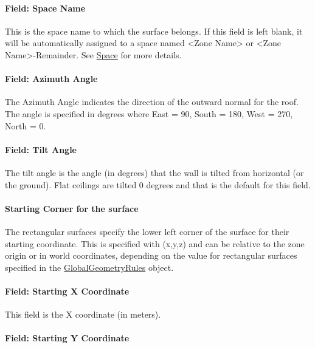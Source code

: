 \paragraph{Field: Space Name}\label{field-space-name-5-005}

This is the space name to which the surface belongs. If this field is left blank, it will be automatically assigned to a space named <Zone Name> or <Zone Name>-Remainder. See \hyperref[space]{Space} for more details.
\paragraph{Field: Azimuth Angle}\label{field-azimuth-angle-5}

The Azimuth Angle indicates the direction of the outward normal for the roof. The angle is specified in degrees where East = 90, South = 180, West = 270, North = 0.

\paragraph{Field: Tilt Angle}\label{field-tilt-angle-5}

The tilt angle is the angle (in degrees) that the wall is tilted from horizontal (or the ground). Flat ceilings are tilted 0 degrees and that is the default for this field.

\paragraph{Starting Corner for the surface}\label{starting-corner-for-the-surface-5}

The rectangular surfaces specify the lower left corner of the surface for their starting coordinate. This is specified with (x,y,z) and can be relative to the zone origin or in world coordinates, depending on the value for rectangular surfaces specified in the \hyperref[globalgeometryrules]{GlobalGeometryRules} object.

\paragraph{Field: Starting X Coordinate}\label{field-starting-x-coordinate-5}

This field is the X coordinate (in meters).

\paragraph{Field: Starting Y Coordinate}\label{field-starting-y-coordinate-5}

